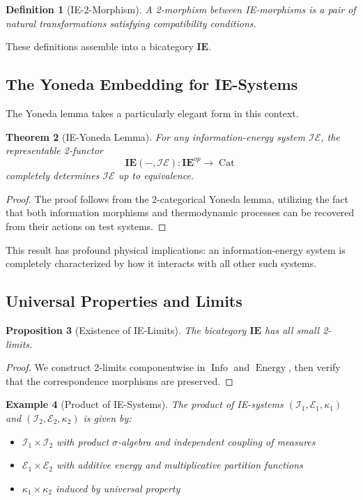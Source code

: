 \documentclass[12pt]{article}
\newtheorem{theorem}{Theorem}[section]
\newtheorem{proposition}[theorem]{Proposition}
\newtheorem{definition}[theorem]{Definition}
\newtheorem{example}[theorem]{Example}
\DeclareMathOperator{\Cat}{Cat}
\DeclareMathOperator{\Info}{Info}
\DeclareMathOperator{\Energy}{Energy}
\begin{document}
\begin{definition}[IE-2-Morphism]
A 2-morphism between IE-morphisms is a pair of natural transformations satisfying compatibility conditions.
\end{definition}

These definitions assemble into a bicategory $\mathbf{IE}$.

\subsection{The Yoneda Embedding for IE-Systems}

The Yoneda lemma takes a particularly elegant form in this context.

\begin{theorem}[IE-Yoneda Lemma]
For any information-energy system $\mathcal{IE}$, the representable 2-functor
\[\mathbf{IE}(-, \mathcal{IE}): \mathbf{IE}^{op} \to \Cat\]
completely determines $\mathcal{IE}$ up to equivalence.
\end{theorem}

\begin{proof}
The proof follows from the 2-categorical Yoneda lemma, utilizing the fact that both information morphisms and thermodynamic processes can be recovered from their actions on test systems.
\end{proof}

This result has profound physical implications: an information-energy system is completely characterized by how it interacts with all other such systems.

\subsection{Universal Properties and Limits}

\begin{proposition}[Existence of IE-Limits]
The bicategory $\mathbf{IE}$ has all small 2-limits.
\end{proposition}

\begin{proof}
We construct 2-limits componentwise in $\Info$ and $\Energy$, then verify that the correspondence morphisms are preserved.
\end{proof}

\begin{example}[Product of IE-Systems]
The product of IE-systems $(\mathcal{I}_1, \mathcal{E}_1, \kappa_1)$ and $(\mathcal{I}_2, \mathcal{E}_2, \kappa_2)$ is given by:
\begin{itemize}
\item $\mathcal{I}_1 \times \mathcal{I}_2$ with product $\sigma$-algebra and independent coupling of measures
\item $\mathcal{E}_1 \times \mathcal{E}_2$ with additive energy and multiplicative partition functions
\item $\kappa_1 \times \kappa_2$ induced by universal property
\end{itemize}
\end{example}
\end{document}
